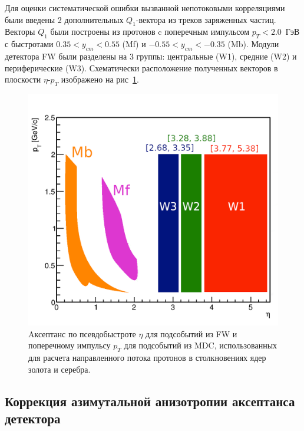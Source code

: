 Для оценки систематической ошибки вызванной непотоковыми корреляциями были введены 2 дополнительных $Q_1$-вектора из треков заряженных частиц.
Векторы $Q_1$ были построены из протонов c поперечным импульсом $p_T < 2.0$~ГэВ с быстротами $0.35 < y_{cm} < 0.55$ (Mf) и $-0.55 < y_{cm} < -0.35$ (Mb).
Модули детектора FW были разделены на 3 группы: центральные (W1), средние (W2) и периферические (W3).
Схематически расположение полученных векторов в плоскости $\eta$-$p_T$ изображено на рис~\ref{fig:hades_qvectors}.
%
\begin{figure}[ht]
\begin{center}
\includegraphics[width=0.75\linewidth]{images/eta_pt_qvectors.png}
\caption{Aксептанс по псевдобыстроте $\eta$ для подсобытий из FW и поперечному импульсу $p_T$ для подсобытий из MDC, использованных для расчета направленного потока протонов в столкновениях ядер золота и серебра.}
\label{fig:hades_qvectors}
\end{center}
\end{figure}
%

\subsection{Коррекция азимутальной анизотропии аксептанса детектора}


